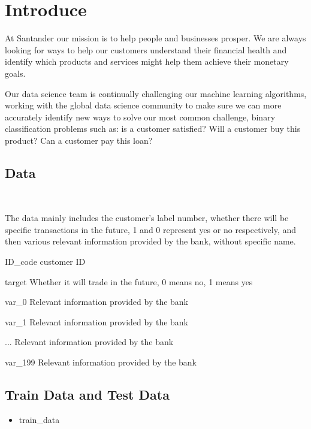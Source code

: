 \section{Introduce} \label{sec-preliminaries}
At Santander our mission is to help people and businesses prosper. We are always looking for ways to help our customers understand their financial health and identify which products and services might help them achieve their monetary goals.

Our data science team is continually challenging our machine learning algorithms, working with the global data science community to make sure we can more accurately identify new ways to solve our most common challenge, binary classification problems such as: is a customer satisfied? Will a customer buy this product? Can a customer pay this loan?

\subsection{Data }
\

The data mainly includes the customer's label number, whether there will be specific transactions in the future, 1 and 0 represent yes or no respectively, and then various relevant information provided by the bank, without specific name.
\begin{description}
\item ID_code
\subitem customer ID
\item target
\subitem Whether it will trade in the future, 0 means no, 1 means yes
\item var_0
\subitem Relevant information provided by the bank
\item var_1
\subitem Relevant information provided by the bank
\item ...
\subitem Relevant information provided by the bank
\item var_199
\subitem Relevant information provided by the bank

\end{description}




\subsection{Train Data and Test Data }
\begin{itemize}
    \item train_data
\end{itemize}

